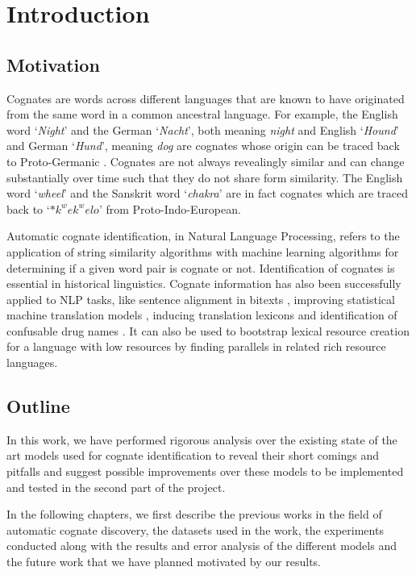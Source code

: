 \chapter{Introduction}

\section{Motivation}

Cognates are words across different languages that are known to have originated from the same word in a common ancestral language. For example, the English word `\textit{Night}' and the German `\textit{Nacht}', both meaning \textit{night} and English `\textit{Hound}' and German `\textit{Hund}', meaning \textit{dog} are cognates whose origin can be traced back to Proto-Germanic \cite{rama2015automatic}. Cognates are not always revealingly similar and can change substantially over time such that they do not share form similarity. The English word `\textit{wheel}' and the Sanskrit word `\textit{chakra}' are in fact cognates which are traced back to `$*k^wek^welo$' from Proto-Indo-European.

Automatic cognate identification, in Natural Language Processing, refers to the application of string similarity algorithms with machine learning algorithms for determining if a given word pair is cognate or not. Identification of cognates is essential in historical linguistics. Cognate information has also been successfully applied to NLP tasks, like sentence alignment in bitexts \cite{simard1993using}, improving statistical machine translation models \cite{kondrak2003cognates}, inducing translation lexicons \cite{mann2001multipath}\cite{tufis2002cheap} and identification of confusable drug names \cite{kondrak2004identification}. It can also be used to bootstrap lexical resource creation for a language with low resources by finding parallels in related rich resource languages.

\section{Outline}

In this work, we have performed rigorous analysis over the existing state of the art models used for cognate identification to reveal their short comings and pitfalls and suggest possible improvements over these models to be implemented and tested in the second part of the project. 

In the following chapters, we first describe the previous works in the field of automatic cognate discovery, the datasets used in the work, the experiments conducted along with the results and error analysis of the different models and the future work that we have planned motivated by our results.

